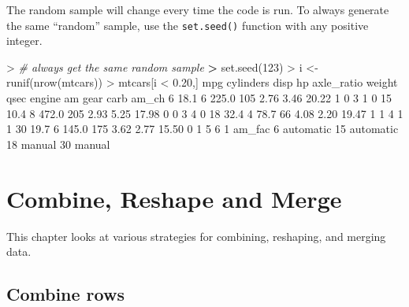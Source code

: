 \documentclass[
]{book}
\newenvironment{Shaded}{\begin{snugshade}}{\end{snugshade}}
\newcommand{\CommentTok}[1]{\textcolor[rgb]{0.56,0.35,0.01}{\textit{#1}}}
\newcommand{\DecValTok}[1]{\textcolor[rgb]{0.00,0.00,0.81}{#1}}
\newcommand{\ErrorTok}[1]{\textcolor[rgb]{0.64,0.00,0.00}{\textbf{#1}}}
\newcommand{\FloatTok}[1]{\textcolor[rgb]{0.00,0.00,0.81}{#1}}
\newcommand{\FunctionTok}[1]{\textcolor[rgb]{0.00,0.00,0.00}{#1}}
\newcommand{\NormalTok}[1]{#1}
\newcommand{\OtherTok}[1]{\textcolor[rgb]{0.56,0.35,0.01}{#1}}
\newcommand{\SpecialCharTok}[1]{\textcolor[rgb]{0.00,0.00,0.00}{#1}}
\begin{document}
The random sample will change every time the code is run. To always generate the same ``random'' sample, use the \texttt{set.seed()} function with any positive integer.

\begin{Shaded}
\begin{Highlighting}[]
\SpecialCharTok{\textgreater{}} \CommentTok{\# always get the same random sample}
\ErrorTok{\textgreater{}} \FunctionTok{set.seed}\NormalTok{(}\DecValTok{123}\NormalTok{)}
\SpecialCharTok{\textgreater{}}\NormalTok{ i }\OtherTok{\textless{}{-}} \FunctionTok{runif}\NormalTok{(}\FunctionTok{nrow}\NormalTok{(mtcars))}
\SpecialCharTok{\textgreater{}}\NormalTok{ mtcars[i }\SpecialCharTok{\textless{}} \FloatTok{0.20}\NormalTok{,]}
\NormalTok{    mpg cylinders  disp  hp axle\_ratio weight  qsec engine am gear carb am\_ch}
\DecValTok{6}  \FloatTok{18.1}         \DecValTok{6} \FloatTok{225.0} \DecValTok{105}       \FloatTok{2.76}   \FloatTok{3.46} \FloatTok{20.22}      \DecValTok{1}  \DecValTok{0}    \DecValTok{3}    \DecValTok{1}     \DecValTok{0}
\DecValTok{15} \FloatTok{10.4}         \DecValTok{8} \FloatTok{472.0} \DecValTok{205}       \FloatTok{2.93}   \FloatTok{5.25} \FloatTok{17.98}      \DecValTok{0}  \DecValTok{0}    \DecValTok{3}    \DecValTok{4}     \DecValTok{0}
\DecValTok{18} \FloatTok{32.4}         \DecValTok{4}  \FloatTok{78.7}  \DecValTok{66}       \FloatTok{4.08}   \FloatTok{2.20} \FloatTok{19.47}      \DecValTok{1}  \DecValTok{1}    \DecValTok{4}    \DecValTok{1}     \DecValTok{1}
\DecValTok{30} \FloatTok{19.7}         \DecValTok{6} \FloatTok{145.0} \DecValTok{175}       \FloatTok{3.62}   \FloatTok{2.77} \FloatTok{15.50}      \DecValTok{0}  \DecValTok{1}    \DecValTok{5}    \DecValTok{6}     \DecValTok{1}
\NormalTok{      am\_fac}
\DecValTok{6}\NormalTok{  automatic}
\DecValTok{15}\NormalTok{ automatic}
\DecValTok{18}\NormalTok{    manual}
\DecValTok{30}\NormalTok{    manual}
\end{Highlighting}
\end{Shaded}

\hypertarget{combine-reshape-and-merge}{%
\chapter{Combine, Reshape and Merge}\label{combine-reshape-and-merge}}

This chapter looks at various strategies for combining, reshaping, and merging data.

\hypertarget{combine-rows}{%
\section{Combine rows}\label{combine-rows}}
\end{document}

